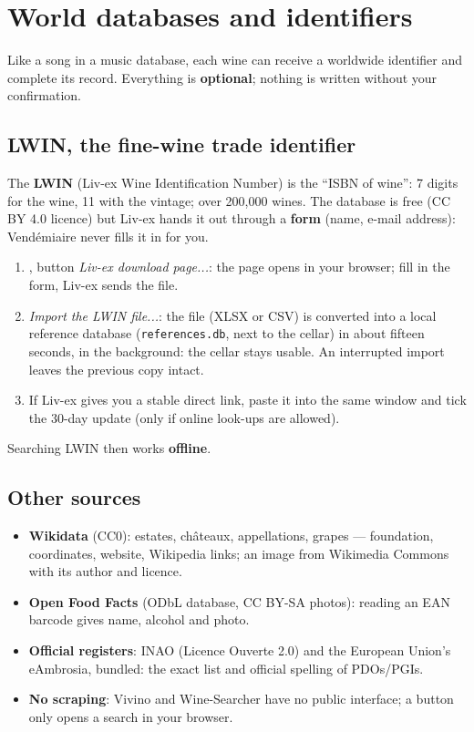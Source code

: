 \documentclass[11pt,a4paper]{article}
\begin{document}

\section{World databases and identifiers}
Like a song in a music database, each wine can receive a worldwide identifier and complete its record.
Everything is \textbf{optional}; nothing is written without your confirmation.

\subsection{LWIN, the fine-wine trade identifier}
The \textbf{LWIN} (Liv-ex Wine Identification Number) is the ``ISBN of wine'': 7 digits for the wine, 11 with
the vintage; over 200,000 wines. The database is free (CC BY 4.0 licence) but Liv-ex hands it out through a
\textbf{form} (name, e-mail address): Vendémiaire never fills it in for you.
\begin{enumerate}
  \item {}, button \emph{Liv-ex download page...}: the page
        opens in your browser; fill in the form, Liv-ex sends the file.
  \item \emph{Import the LWIN file...}: the file (XLSX or CSV) is converted into a local reference database
        (\texttt{references.db}, next to the cellar) in about fifteen seconds, in the background: the cellar
        stays usable. An interrupted import leaves the previous copy intact.
  \item If Liv-ex gives you a stable direct link, paste it into the same window and tick the 30-day update
        (only if online look-ups are allowed).
\end{enumerate}
Searching LWIN then works \textbf{offline}.


\subsection{Other sources}
\begin{itemize}
  \item \textbf{Wikidata} (CC0): estates, châteaux, appellations, grapes — foundation, coordinates, website,
        Wikipedia links; an image from Wikimedia Commons with its author and licence.
  \item \textbf{Open Food Facts} (ODbL database, CC BY-SA photos): reading an EAN barcode gives name, alcohol
        and photo.
  \item \textbf{Official registers}: INAO (Licence Ouverte 2.0) and the European Union's eAmbrosia, bundled:
        the exact list and official spelling of PDOs/PGIs.
  \item \textbf{No scraping}: Vivino and Wine-Searcher have no public interface; a button only opens a search
        in your browser.
\end{itemize}
\end{document}
